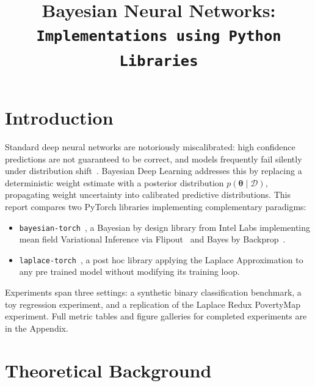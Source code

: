 \documentclass[conference]{IEEEtran}
\newcommand{\btheta}{\bm{\theta}}
\newcommand{\cD}{\mathcal{D}}
\begin{document}
\title{Bayesian Neural Networks:\\
\texttt{Implementations using Python Libraries}}

\author{
}

\maketitle

\section{Introduction}
\label{sec:intro}

Standard deep neural networks are notoriously miscalibrated: high confidence
predictions are not guaranteed to be correct, and models frequently fail
silently under distribution shift~\citep{goan2020bayesian,murphy2023pml}.
Bayesian Deep Learning addresses this by replacing a deterministic weight
estimate with a posterior distribution $p(\btheta \mid \cD)$, propagating weight
uncertainty into calibrated predictive distributions.
This report compares two PyTorch libraries implementing complementary paradigms:
\begin{itemize}[leftmargin=*]
  \item \texttt{bayesian-torch}~\citep{intel2021bayesiantorch}, a
        Bayesian by design library from Intel Labs implementing mean field
        Variational Inference via Flipout~\citep{wen2018flipout} and
        Bayes by Backprop~\citep{blundell2015weight}.
  \item \texttt{laplace-torch}~\citep{daxberger2021laplace,aleximmer2024laplace},
        a post hoc library applying the Laplace Approximation to any
        pre trained model without modifying its training loop.
\end{itemize}

Experiments span three settings: a synthetic binary classification
benchmark, a toy regression
experiment, and a replication of the
Laplace Redux PovertyMap experiment.
Full metric tables and figure galleries for completed experiments are in the
Appendix.

\section{Theoretical Background}
\label{sec:theory}
\end{document}
